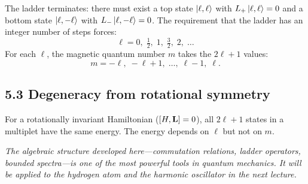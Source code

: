\documentclass[12pt,a4paper]{article}
\begin{document}
The ladder terminates: there must exist a top state $\ket{\ell, \ell}$ with $L_+\ket{\ell, \ell} = 0$ and a bottom state $\ket{\ell, -\ell}$ with $L_-\ket{\ell, -\ell} = 0$.  The requirement that the ladder has an integer number of steps forces:
\[
    \ell = 0, \;\tfrac{1}{2}, \;1, \;\tfrac{3}{2}, \;2, \;\ldots
\]
For each $\ell$, the magnetic quantum number $m$ takes the $2\ell+1$ values:
\[
    m = -\ell, \;-\ell+1, \;\ldots, \;\ell-1, \;\ell.
\]

\subsection{5.3 Degeneracy from rotational symmetry}

For a rotationally invariant Hamiltonian ($[H, \vb{L}] = 0$), all $2\ell + 1$ states in a multiplet have the same energy.  The energy depends on $\ell$ but not on $m$.

\medskip
\noindent\textit{The algebraic structure developed here---commutation relations, ladder operators, bounded spectra---is one of the most powerful tools in quantum mechanics.  It will be applied to the hydrogen atom and the harmonic oscillator in the next lecture.}
\end{document}
